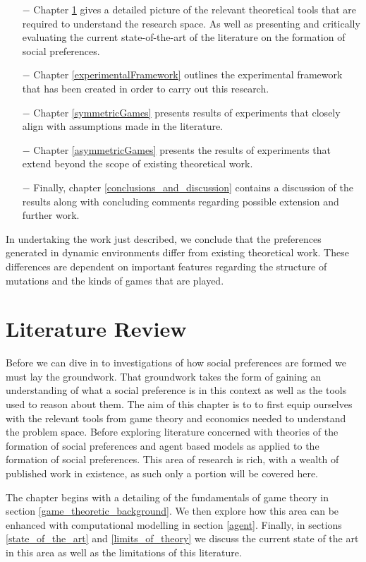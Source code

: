 \documentclass[11pt]{book}
\newcommand*{\np}{\par\noindent\newline}
\begin{document}
\begin{itemize}
	\item[$-$] Chapter \ref{lit_review} gives a detailed picture of the relevant theoretical tools that are required to understand the research space. 
		As well as presenting and critically evaluating the current state-of-the-art of the literature on the formation of social preferences.
	\item[$-$] Chapter \ref{experimentalFramework} outlines the experimental framework that has been created in order to carry out this research.
	\item [$-$] Chapter \ref{symmetricGames} presents results of experiments that closely align with assumptions made in the literature.
	\item [$-$] Chapter \ref{asymmetricGames} presents the results of experiments that extend beyond the scope of existing theoretical work.
	\item [$-$] Finally, chapter \ref{conclusions_and_discussion} contains a discussion of the results along with concluding comments regarding possible extension and further work.
\end{itemize}

\np In undertaking the work just described, we conclude that the preferences generated in dynamic environments differ from existing theoretical work.
These differences are dependent on important features regarding the structure of mutations and the kinds of games that are played.


\chapter{Literature Review}\label{lit_review}
Before we can dive in to investigations of how social preferences are formed we must lay the groundwork.
That groundwork takes the form of gaining an understanding of what a social preference is in this context as well as the tools used to reason about them.
The aim of this chapter is to to first equip ourselves with the relevant tools from game theory and economics needed to understand the problem space.
Before exploring literature concerned with theories of the formation of social preferences and agent based models as applied to the formation of social preferences. 
This area of research is rich, with a wealth of published work in existence, as such only a portion will be covered here.

\np The chapter begins with a detailing of the fundamentals of game theory in section \ref{game_theoretic_background}.
We then explore how this area can be enhanced with computational modelling in section \ref{agent}.
Finally, in sections \ref{state_of_the_art} and \ref{limits_of_theory} we discuss the current state of the art in this area as well as the limitations of this literature.
\end{document}
